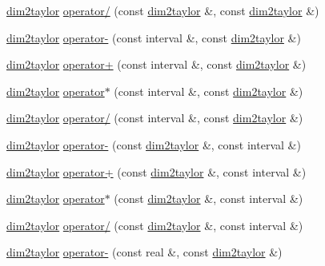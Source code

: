 \begin{DoxyCompactItemize}
\item 
\hyperlink{classtaylor_1_1dim2taylor}{dim2taylor} \hyperlink{classtaylor_1_1dim2taylor_a3b317bf23d21b4e71893fd523f73e961}{operator/} (const \hyperlink{classtaylor_1_1dim2taylor}{dim2taylor} \&, const \hyperlink{classtaylor_1_1dim2taylor}{dim2taylor} \&)
\item 
\hyperlink{classtaylor_1_1dim2taylor}{dim2taylor} \hyperlink{classtaylor_1_1dim2taylor_a2957c8c107e41f10212695f7cc4e67b3}{operator-\/} (const interval \&, const \hyperlink{classtaylor_1_1dim2taylor}{dim2taylor} \&)
\item 
\hyperlink{classtaylor_1_1dim2taylor}{dim2taylor} \hyperlink{classtaylor_1_1dim2taylor_a94f1681d271c24986e505d2cab8672b3}{operator+} (const interval \&, const \hyperlink{classtaylor_1_1dim2taylor}{dim2taylor} \&)
\item 
\hyperlink{classtaylor_1_1dim2taylor}{dim2taylor} \hyperlink{classtaylor_1_1dim2taylor_abc89439f8317a6edbdcb10f0985a6a45}{operator$\ast$} (const interval \&, const \hyperlink{classtaylor_1_1dim2taylor}{dim2taylor} \&)
\item 
\hyperlink{classtaylor_1_1dim2taylor}{dim2taylor} \hyperlink{classtaylor_1_1dim2taylor_ac8e54bc904ea5484d3396718abb1f11b}{operator/} (const interval \&, const \hyperlink{classtaylor_1_1dim2taylor}{dim2taylor} \&)
\item 
\hyperlink{classtaylor_1_1dim2taylor}{dim2taylor} \hyperlink{classtaylor_1_1dim2taylor_af606a5ebad7f118ee1a76a5ab4e0726a}{operator-\/} (const \hyperlink{classtaylor_1_1dim2taylor}{dim2taylor} \&, const interval \&)
\item 
\hyperlink{classtaylor_1_1dim2taylor}{dim2taylor} \hyperlink{classtaylor_1_1dim2taylor_aa933d2b6b2551cbc590f399f49411eac}{operator+} (const \hyperlink{classtaylor_1_1dim2taylor}{dim2taylor} \&, const interval \&)
\item 
\hyperlink{classtaylor_1_1dim2taylor}{dim2taylor} \hyperlink{classtaylor_1_1dim2taylor_a9d529379a2fb41cb1d82891fc27f9a7a}{operator$\ast$} (const \hyperlink{classtaylor_1_1dim2taylor}{dim2taylor} \&, const interval \&)
\item 
\hyperlink{classtaylor_1_1dim2taylor}{dim2taylor} \hyperlink{classtaylor_1_1dim2taylor_ab207e289fba8f39a622b2413b80663dc}{operator/} (const \hyperlink{classtaylor_1_1dim2taylor}{dim2taylor} \&, const interval \&)
\item 
\hyperlink{classtaylor_1_1dim2taylor}{dim2taylor} \hyperlink{classtaylor_1_1dim2taylor_a0514d94015d5aa559812f43086cdea02}{operator-\/} (const real \&, const \hyperlink{classtaylor_1_1dim2taylor}{dim2taylor} \&)

\end{DoxyCompactItemize}
